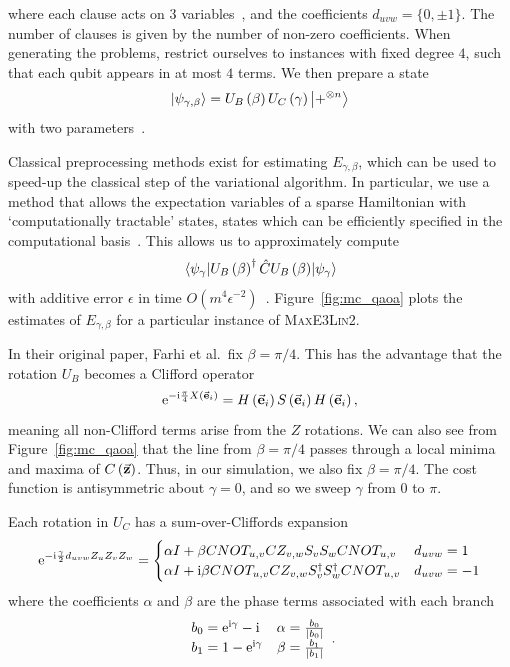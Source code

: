 where each clause acts on $3$ variables~\cite{Farhi2014b,Bravyi2018}, and the coefficients $d_{uvw}=\{0,\pm1\}$. The number of clauses is given by the number of non-zero coefficients. When generating the problems, restrict ourselves to instances with fixed degree $4$, such that each qubit appears in at most $4$ terms. We then prepare a state 
\[\ket{\psi_{\gamma,\beta}} = U_{B}\left(\beta\right)U_{C}\left(\gamma\right)\ket{+^{\otimes n}}\]
with two parameters~\cite{Farhi2014b}.\par
Classical preprocessing methods exist for estimating $E_{\gamma,\beta}$, which can be used to speed-up the classical step of the variational algorithm. In particular, we use a method that allows the expectation variables of a sparse Hamiltonian with `computationally tractable' states, states which can be efficiently specified in the computational basis~\cite{VandenNest2009}. This allows us to approximately compute
\[\matrixel{\psi_{\gamma}}{U_{B}\left(\beta\right)^{\dagger} \hat{C}U_{B}\left(\beta\right)}{\psi_{\gamma}}\]
with additive error $\epsilon$ in time $O(m^{4}\epsilon^{-2})$~\cite{Bravyi2018}. Figure~\ref{fig:mc_qaoa} plots the estimates of $E_{\gamma,\beta}$ for a particular instance of \textsc{MaxE3Lin2}.\par
In their original paper, Farhi et al.\ fix $\beta=\pi/4$. This has the advantage that the rotation $U_{B}$ becomes a Clifford operator 
\[\mathrm{e}^{-\mathrm{i} \frac{\pi}{4} X\left(\va{e}_{i}\right)}=H\left(\va{e}_{i}\right)S\left(\va{e}_{i}\right)H\left(\va{e}_{i}\right),\]
meaning all non-Clifford terms arise from the $Z$ rotations. We can also see from Figure~\ref{fig:mc_qaoa} that the line from $\beta=\pi/4$ passes through a local minima and maxima of $C\left(\va{z}\right)$. Thus, in our simulation, we also fix $\beta=\pi/4$. The cost function is antisymmetric about $\gamma=0$, and so we sweep $\gamma$ from $0$ to $\pi$.\par
Each rotation in $U_{C}$ has a sum-over-Cliffords expansion~\cite{Bravyi2018}
\[\mathrm{e}^{-\mathrm{i} \frac{\gamma}{2} d_{uvw}Z_{u}Z_{v}Z_{w}} = \begin{cases}
\alpha I + \beta CNOT_{u,v}CZ_{v,w}S_{v}S_{w}CNOT_{u,v} & d_{uvw} = 1\\
\alpha I + \mathrm{i}\beta CNOT_{u,v}CZ_{v,w}S^{\dagger}_{v}S^{\dagger}_{w}CNOT_{u,v} & d_{uvw} = -1\\
\end{cases}\]
where the coefficients $\alpha$ and $\beta$ are the phase terms associated with each branch
\[\begin{array}{lr}
b_{0} = \mathrm{e}^{\mathrm{i} \gamma}-\mathrm{i} & \alpha = \frac{b_{0}}{\left|b_{0}\right|}\\
b_{1} = 1 - \mathrm{e}^{\mathrm{i} \gamma} & \beta = \frac{b_{1}}{\left|b_{1}\right|}\\
\end{array}.\]
